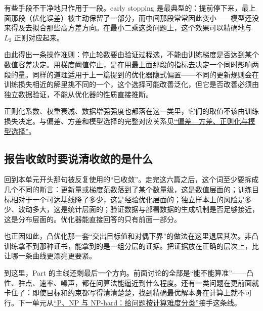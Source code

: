 有些手段不干净地只作用于一段。early stopping 是最典型的：提前停下来，最上面那段（优化误差）被主动保留了一部分，而中间那段常常因此变小——模型还没来得及去拟合那些高方差方向。在最小二乘这类问题上，这个效果可以精确地与 \(L_2\) 正则对应起来。

由此得出一条操作准则：停止轮数要由验证过程选，不能由训练梯度是否达到某个数值容差决定。用梯度阈值停止，是在用最上面那段的指标去决定一个同时影响两段的量。同样的道理适用于上一篇提到的优化器隐式偏置——不同的更新规则会在训练损失相近的解里挑不同的一个，这个选择可能改善泛化，但它是否改善必须由独立数据验证，不能从优化器的性质直接推断。

正则化系数、权重衰减、数据增强强度也都落在这一类里，它们的取值不该由训练损失决定。与偏差、方差和模型选择的完整对应关系见\hyperref[sec:11-Mathematical-Statistics/06-Resampling-and-Model-Selection/04]{``偏差---方差、正则化与模型选择''}。

\subsection{报告收敛时要说清收敛的是什么}

回到本单元开头那句被反复使用的``已收敛''。走完这六篇之后，这个词至少要拆成几个不同的断言：更新量或梯度范数落到了某个数量级，这是数值层面的；训练目标相对于一个可达基线降了多少，这是经验优化层面的；独立样本上的风险是多少、波动多大，这是统计层面的；验证数据与部署数据的生成机制是否足够接近，这是分布层面的。优化器能直接回答的只有前面一部分。

也正因如此，凸优化那一套``交出目标值和对偶下界''的做法在这里退居其次。非凸训练拿不到那种证书，能拿到的是一组分层的证据。把证据放在正确的层次上，比让哪一条曲线更漂亮更要紧。

到这里，Part 的主线还剩最后一个方向。前面讨论的全部是``能不能算准''——凸性、驻点、速率、噪声，都在问算法能逼近到什么程度。还有一类问题在更前面就卡住了：即使目标和约束都写得清清楚楚，找到精确最优解本身在计算上就不可行。下一单元从\hyperref[sec:09-Convex-Optimization/09-Complexity-and-Approximation/01]{``P、NP 与 NP-hard：给问题按计算难度分类''}接手这条线。

